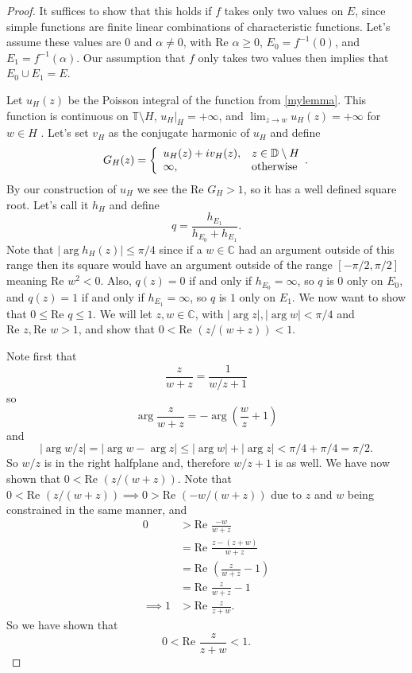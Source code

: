 \documentclass[a4paper,12pt,twoside,BCOR=10mm]{scrbook}
\theoremstyle{definition}
\theoremstyle{definition}
\theoremstyle{definition}
\renewcommand{\Re}{\text{Re }}
\begin{document}
\begin{proof}
It suffices to show that this holds if $f$ takes only two values on $E$, since simple functions are finite linear combinations of characteristic functions.
Let's assume these values are $0$ and $\alpha \neq 0$, with $\Re \alpha \geq 0$, $E_0 = f^{-1}(0)$, and $E_1 = f^{-1}(\alpha)$.
Our assumption that $f$ only takes two values then implies that $E_0 \cup E_1 = E$.

Let $u_H(z)$ be the Poisson integral of the function from \ref{mylemma}.
This function is continuous on $\mathbb{T} \setminus H$, $u_H|_H = +\infty$, and $\lim_{z \rightarrow w} u_H(z) = +\infty$ for $w \in H$ \citep[page $234$]{rudin2}.
Let's set $v_H$ as the conjugate harmonic of $u_H$ and define
\[
	G_H(z) =
	\left \{
		\begin{array}{l l}
		u_H(z) + iv_H(z), & z \in \mathbb{D} \setminus H\\
		\infty, & \text{otherwise}
		\end{array}.
	\right .
\]
By our construction of $u_H$ we see the $\Re G_H > 1$, so it has a well defined square root.
Let's call it $h_H$ and define
\[
	q = \frac{h_{E_1}}{h_{E_0} + h_{E_1}}.
\]
Note that $|\arg h_H(z)| \leq \pi/4$ since if a $w \in \mathbb{C}$ had an argument outside of this range then its square would have an argument outside of the range $[-\pi/2, \pi/2]$ meaning $\Re w^2 < 0$.
Also, $q(z) = 0$ if and only if $h_{E_0} = \infty$, so $q$ is $0$ only on $E_0$, and $q(z) = 1$ if and only if $h_{E_1} = \infty$, so $q$ is $1$ only on $E_1$.
We now want to show that $0 \leq \Re q \leq 1$.
We will let $z, w \in \mathbb{C}$, with $|\arg z|, |\arg w| < \pi/4$ and $\Re z, \Re w > 1$, and show that $0 < \Re (z/(w + z)) < 1$.

Note first that
\[
	\frac{z}{w + z}
	=
	\frac{1}{w/z + 1}
\]
so 
\[
	\arg \frac{z}{w + z} = -\arg \left ( \frac{w}{z} + 1 \right )
\]
and
\[
	|\arg w/z| = |\arg w - \arg z| \leq |\arg w| + |\arg z| < \pi/4 + \pi/4 = \pi/2.
\]
So $w/z$ is in the right halfplane and, therefore $w/z + 1$ is as well.
We have now shown that $0 < \Re ( z/(w + z) ) $.
Note that $0 < \Re \left ( z/(w + z) \right ) \implies 0 > \Re ( -w/(w + z) )$ due to $z$ and $w$ being constrained in the same manner, and
\begin{align*}
	0
	&> \Re \frac{-w}{w + z}\\
	&= \Re \frac{z - (z + w)}{w + z}\\
	&= \Re \left ( \frac{z}{w + z} - 1 \right )\\
	&= \Re \frac{z}{w + z} - 1\\
	\implies 1 &> \Re \frac{z}{z + w}.
\end{align*}
So we have shown that
\[
	0 < \Re \frac{z}{z + w} < 1.
\]


\end{proof}
\end{document}
